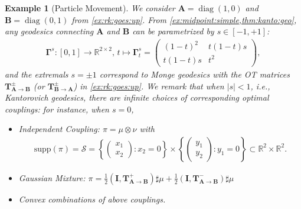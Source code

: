 \documentclass[noinfoline]{imsart}\setcounter{tocdepth}{2}
\renewcommand{\b}[1]{\mathbb{#1}} %
\newcommand{\m}[1]{\mathbf{#1}} %
\renewcommand{\c}[1]{\mathcal{#1}} %
\DeclareMathOperator*{\diag}{diag}
\theoremstyle{plain}
\newtheorem{example}{Example}[section]
\begin{document}
\begin{example}[Particle Movement]
We consider $\m{A} = \diag(1, 0)$ and $\m{B} = \diag(0, 1)$ from \cref{ex:rk:goes:up}. From \cref{ex:midpoint:simple,thm:kanto:geo}, any geodesics connecting $\m{A}$ and $\m{B}$ can be parametrized by $s \in [-1, +1]$: 
\begin{align*}
    \m{\Gamma}^{s}: [0, 1] \to \b{R}^{2 \times 2}, \, t \mapsto \m{\Gamma}_{t}^{s} = \begin{pmatrix}
        (1-t)^{2} & t(1-t)s \\
        t(1-t)s & t^{2}
    \end{pmatrix},
\end{align*}
and the extremals $s = \pm 1$ correspond to Monge geodesics with the OT matrices $\m{T}_{\m{A} \to \m{B}}^{\pm}$ (or $\m{T}_{\m{B} \to \m{A}}^{\pm}$) in \cref{ex:rk:goes:up}. We remark that when $|s| < 1$, i.e., Kantorovich geodesics, there are infinite choices of corresponding optimal couplings: for instance, when $s=0$,
\begin{itemize}
\item Independent Coupling: $\pi = \mu \otimes \nu$ with
\begin{align*}
    \text{supp}(\pi) = \c{S} = \left\{ \begin{pmatrix}
    x_{1} \\ x_{2}
    \end{pmatrix} : x_{2} = 0 \right\} \times \left\{ \begin{pmatrix}
    y_{1} \\ y_{2}
    \end{pmatrix} : y_{1} =0 \right\} \subset \b{R}^{2} \times \b{R}^{2}.
\end{align*}
\item Gaussian Mixture: $\pi = \frac{1}{2} (\m{I}, \m{T}_{\m{A} \to \m{B}}^{+}) \sharp \mu + \frac{1}{2} (\m{I}, \m{T}_{\m{A} \to \m{B}}^{-}) \sharp \mu$
\item Convex combinations of above couplings.
\end{itemize}


\end{example}
\end{document}
